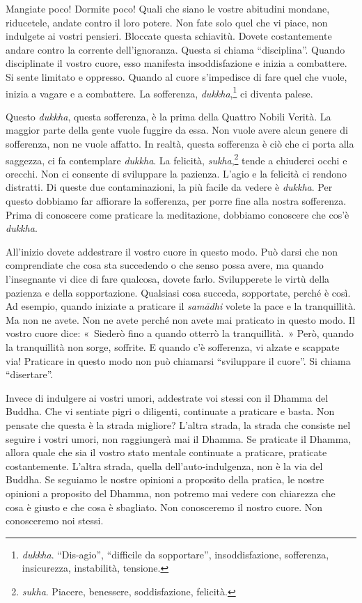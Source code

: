 Mangiate poco! Dormite poco! Quali che siano le vostre abitudini
mondane, riducetele, andate contro il loro potere. Non fate solo quel
che vi piace, non indulgete ai vostri pensieri. Bloccate questa
schiavitù. Dovete costantemente andare contro la corrente
dell'ignoranza. Questa si chiama ``disciplina''. Quando disciplinate il
vostro cuore, esso manifesta insoddisfazione e inizia a combattere. Si
sente limitato e oppresso. Quando al cuore s'impedisce di fare quel che
vuole, inizia a vagare e a combattere. La sofferenza,
\emph{dukkha},\footnote{\emph{dukkha}. ``Dis-agio'', ``difficile da
  sopportare'', insoddisfazione, sofferenza, insicurezza, instabilità,
  tensione.} ci diventa palese.

Questo \emph{dukkha}, questa sofferenza, è la prima della Quattro Nobili
Verità. La maggior parte della gente vuole fuggire da essa. Non vuole
avere alcun genere di sofferenza, non ne vuole affatto. In realtà,
questa sofferenza è ciò che ci porta alla saggezza, ci fa contemplare
\emph{dukkha}. La felicità, \emph{sukha},\footnote{\emph{sukha}.
  Piacere, benessere, soddisfazione, felicità.} tende a chiuderci occhi
e orecchi. Non ci consente di sviluppare la pazienza. L'agio e la
felicità ci rendono distratti. Di queste due contaminazioni, la più
facile da vedere è \emph{dukkha}. Per questo dobbiamo far affiorare la
sofferenza, per porre fine alla nostra sofferenza. Prima di conoscere
come praticare la meditazione, dobbiamo conoscere che cos'è
\emph{dukkha}.

All'inizio dovete addestrare il vostro cuore in questo modo. Può darsi
che non comprendiate che cosa sta succedendo o che senso possa avere, ma
quando l'insegnante vi dice di fare qualcosa, dovete farlo. Svilupperete
le virtù della pazienza e della sopportazione. Qualsiasi cosa succeda,
sopportate, perché è così. Ad esempio, quando iniziate a praticare il
\emph{samādhi} volete la pace e la tranquillità. Ma non ne avete. Non ne
avete perché non avete mai praticato in questo modo. Il vostro cuore
dice: «~Siederò fino a quando otterrò la tranquillità.~» Però, quando la
tranquillità non sorge, soffrite. E quando c'è sofferenza, vi alzate e
scappate via! Praticare in questo modo non può chiamarsi ``sviluppare il
cuore''. Si chiama ``disertare''.

Invece di indulgere ai vostri umori, addestrate voi stessi con il Dhamma
del Buddha. Che vi sentiate pigri o diligenti, continuate a praticare e
basta. Non pensate che questa è la strada migliore? L'altra strada, la
strada che consiste nel seguire i vostri umori, non raggiungerà mai il
Dhamma. Se praticate il Dhamma, allora quale che sia il vostro stato
mentale continuate a praticare, praticate costantemente. L'altra strada,
quella dell'auto-indulgenza, non è la via del Buddha. Se seguiamo le
nostre opinioni a proposito della pratica, le nostre opinioni a
proposito del Dhamma, non potremo mai vedere con chiarezza che cosa è
giusto e che cosa è sbagliato. Non conosceremo il nostro cuore. Non
conosceremo noi stessi.


